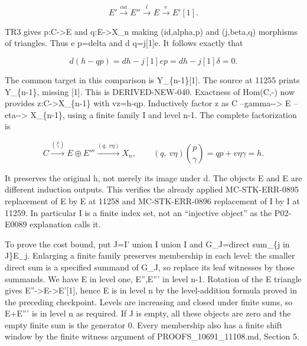 \documentclass[11pt]{article}
\begin{document}
\[
 E'\xrightarrow{\alpha a}E''\xrightarrow l E
                     \xrightarrow e E'[1].
\]

TR3 gives p:\allowbreak{}C\allowbreak{}->E and q:\allowbreak{}E\allowbreak{}->X\_\allowbreak{}n making (id,\allowbreak{}alpha,\allowbreak{}p)\allowbreak{} and (j,\allowbreak{}beta,\allowbreak{}q)\allowbreak{} morphisms of triangles. Thus e p\allowbreak{}=delta and d q\allowbreak{}=j[1]\allowbreak{}e. It follows exactly that

\[
 d(h-qp)=dh-j[1]ep=dh-j[1]\delta=0.
\]

The common target in this comparison is Y\_\allowbreak{}\{n-1\}[1]\allowbreak{}. The source at 11255 prints Y\_\allowbreak{}\{n-1\},\allowbreak{} missing [1]\allowbreak{}. This is DERIVED-NEW-040. Exactness of Hom(C,\allowbreak{}-)\allowbreak{} now provides z:\allowbreak{}C\allowbreak{}->X\_\allowbreak{}\{n-1\} with vz\allowbreak{}=h-qp. Inductively factor z as C --gamma-\allowbreak{}-> E\textquotesingle\textquotesingle\textquotesingle{} --eta-\allowbreak{}-> X\_\allowbreak{}\{n-1\},\allowbreak{} using a finite family I\textquotesingle\textquotesingle\textquotesingle{} and level n-1. The complete factorization is

\[
 C\xrightarrow{\binom p\gamma}E\oplus E'''
       \xrightarrow{(q,\ v\eta)}X_n,
 \qquad (q,\ v\eta)\binom p\gamma=qp+v\eta\gamma=h.
\]

It preserves the original h,\allowbreak{} not merely its image under d. The objects E\textquotesingle\textquotesingle{} and E\textquotesingle\textquotesingle\textquotesingle{} are different induction outputs. This verifies the already applied MC-STK-ERR-0895 replacement of E\textquotesingle\textquotesingle{} by E\textquotesingle\textquotesingle\textquotesingle{} at 11258 and MC-STK-ERR-0896 replacement of I\textquotesingle{} by I\textquotesingle\textquotesingle\textquotesingle{} at 11259. In particular I\textquotesingle\textquotesingle\textquotesingle{} is a finite index set,\allowbreak{} not an ``injective object'' as the P02-E0089 explanation calls it.

To prove the cost bound,\allowbreak{} put J\allowbreak{}=I' union I\textquotesingle\textquotesingle{} union I\textquotesingle\textquotesingle\textquotesingle{} and G\_\allowbreak{}J\allowbreak{}=direct sum\_\allowbreak{}\{j in J\}E\_\allowbreak{}j. Enlarging a finite family preserves membership in each level:\allowbreak{} the smaller direct sum is a specified summand of G\_\allowbreak{}J,\allowbreak{} so replace its leaf witnesses by those summands. We have E\textquotesingle{} in level one,\allowbreak{} E'',\allowbreak{}E''' in level n-1. Rotation of the E triangle gives E''\allowbreak{}->E\allowbreak{}->E'[1]\allowbreak{},\allowbreak{} hence E is in level n by the level-addition formula proved in the preceding checkpoint. Levels are increasing and closed under finite sums,\allowbreak{} so E\allowbreak{}+E''' is in level n as required. If J is empty,\allowbreak{} all these objects are zero and the empty finite sum is the generator 0. Every membership also has a finite shift window by the finite witness argument of PROOFS\_\allowbreak{}10691\_\allowbreak{}11108.md,\allowbreak{} Section 5.
\end{document}
